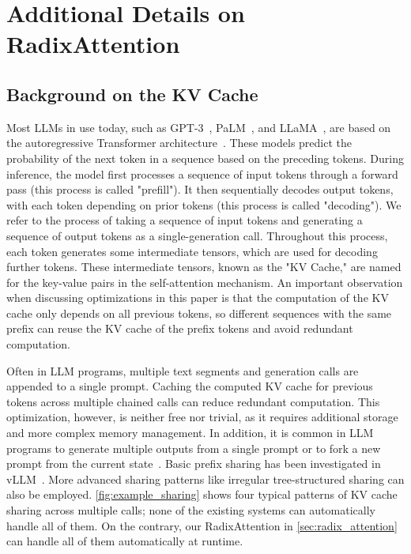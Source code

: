 \section{Additional Details on RadixAttention}
\label{sec:additional_radix_attention}

\subsection{Background on the KV Cache}
\label{subsec:background_kv_cache}

Most LLMs in use today, such as GPT-3~\cite{brown2020language}, PaLM~\cite{chowdhery2022palm}, and LLaMA~\cite{touvron2023llama2}, are based on the autoregressive Transformer architecture~\cite{vaswani2017attention}.
These models predict the probability of the next token in a sequence based on the preceding tokens.
During inference, the model first processes a sequence of input tokens through a forward pass (this process is called "prefill").
It then sequentially decodes output tokens, with each token depending on prior tokens (this process is called "decoding").
We refer to the process of taking a sequence of input tokens and generating a sequence of output tokens as a single-generation call.
Throughout this process, each token generates some intermediate tensors, which are used for decoding further tokens.
These intermediate tensors, known as the "KV Cache," are named for the key-value pairs in the self-attention mechanism.
An important observation when discussing optimizations in this paper is that the computation of the KV cache only depends on all previous tokens, so different sequences with the same prefix can reuse the KV cache of the prefix tokens and avoid redundant computation.

Often in LLM programs, multiple text segments and generation calls are appended to a single prompt. Caching the computed KV cache for previous tokens across multiple chained calls can reduce redundant computation. This optimization, however, is neither free nor trivial, as it requires additional storage and more complex memory management.
In addition, it is common in LLM programs to generate multiple outputs from a single prompt or to fork a new prompt from the current state~\cite{li2022competition}. Basic prefix sharing has been investigated in vLLM~\cite{kwon2023vllm}. More advanced sharing patterns like irregular tree-structured sharing can also be employed. \autoref{fig:example_sharing} shows four typical patterns of KV cache sharing across multiple calls; none of the existing systems can automatically handle all of them.
On the contrary, our RadixAttention in \autoref{sec:radix_attention} can handle all of them automatically at runtime.


